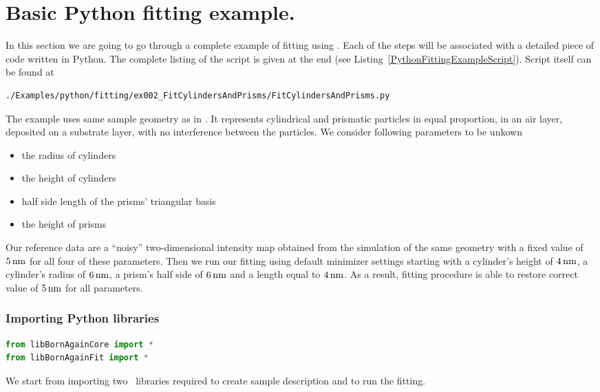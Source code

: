 \section{Basic Python fitting example.} 

In this section we are going to go through a complete example of
fitting using \BornAgain. Each of the steps will be associated with a
detailed piece of code written in Python. 
The complete listing of
the script is given at the end (see Listing~\ref{PythonFittingExampleScript}).
Script itself can be found at
\begin{lstlisting}[language=shell, style=commandline]
./Examples/python/fitting/ex002_FitCylindersAndPrisms/FitCylindersAndPrisms.py
\end{lstlisting}

\noindent
The example uses same sample geometry as in .
It represents cylindrical and
prismatic particles in equal proportion, in an air layer, deposited on a substrate layer, with no interference
between the particles. We consider following parameters to be unkown
\begin{itemize}
\item the radius of cylinders
\item the height of cylinders
\item half side length of the prisms' triangular basis
\item the height of prisms
\end{itemize}

Our reference data are a ``noisy'' two-dimensional intensity
map obtained from the simulation of the same geometry with a fixed
value of $5\,{\rm nm}$ for all four of these parameters. 
Then we run our fitting using default minimizer settings
starting with a cylinder's height
of $4\,{\rm nm}$, a cylinder's radius of $6\,{\rm nm}$, 
a prism's half side of $6\,{\rm nm}$ and a length equal to $4\,{\rm nm}$.
As a result, fitting procedure is able to restore correct value of $5\,{\rm nm}$
for all parameters.


\subsubsection*{Importing Python libraries}
\begin{lstlisting}[language=python, style=eclipseboxed]
from libBornAgainCore import *
from libBornAgainFit import *
\end{lstlisting}
We start from importing two \BornAgain\ libraries required to create sample description
and to run the fitting.


